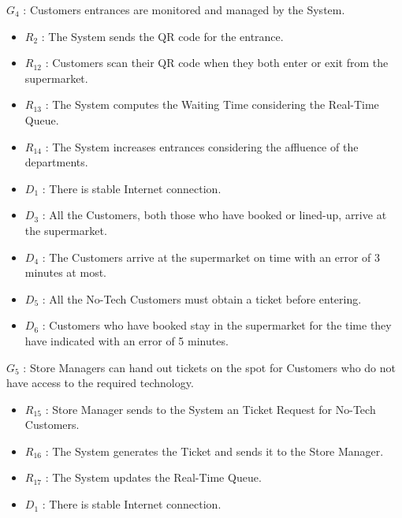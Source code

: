$G_4$ : Customers entrances are monitored and managed by the System.
\begin{itemize}
	\item $R_2$ : The System sends the QR code for the entrance.
	\item $R_{12}$ : Customers scan their QR code when they both enter or exit from the supermarket.
	\item $R_{13}$ : The System computes the Waiting Time considering the Real-Time Queue.
	\item $R_{14}$ : The System increases entrances considering the affluence of the departments.
	\item $D_1$ : There is stable Internet connection.
	\item $D_3$ : All the Customers, both those who have booked or lined-up, arrive at the supermarket. 
	\item $D_4$ : The Customers arrive at the supermarket on time with an error of 3 minutes at most.
	\item $D_5$ : All the No-Tech Customers must obtain a ticket before entering.
	\item $D_6$ : Customers who have booked stay in the supermarket for the time they have indicated with an error of 5 minutes.
\end{itemize}
$G_5$ : Store Managers can hand out tickets on the spot for Customers who do not have access to the required technology.
\begin{itemize}
	\item $R_{15}$ : Store Manager sends to the System an Ticket Request for No-Tech Customers.
	\item $R_{16}$ : The System generates the Ticket and sends it to the Store Manager.
	\item $R_{17}$ : The System updates the Real-Time Queue.
	\item $D_1$ : There is stable Internet connection. 
\end{itemize}

 
 
